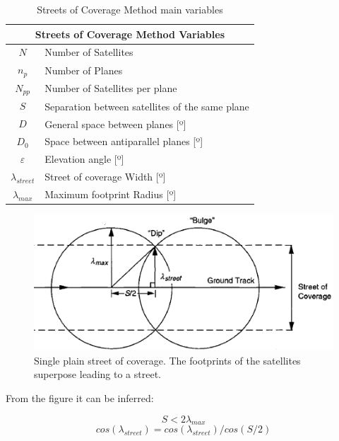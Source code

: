 \begin{table}[H]
\centering
\begin{tabular}{|c|l|}
\hline
\multicolumn{2}{|c|}{Streets of Coverage Method Variables}     \\ \hline
$$N$$              & Number of Satellites                      \\ \hline
$n_{p}$            & Number of Planes                          \\ \hline
$N_{pp}$           & Number of Satellites per plane            \\ \hline
$$S$$              & Separation between satellites of the same plane \\ \hline
$$D$$              & General space between planes {[}º{]}      \\ \hline
$D_{0}$            & Space between antiparallel planes {[}º{]} \\ \hline
$\varepsilon$      & Elevation angle {[}º{]}                   \\ \hline
$\lambda_{street}$ & Street of coverage Width {[}º{]}          \\ \hline
$\lambda_{max}$    & Maximum footprint Radius {[}º{]}          \\ \hline
\end{tabular}
\caption{Streets of Coverage Method main variables}
\end{table}  

\begin{figure}[H]
\begin{center}
\includegraphics[scale=0.7]{PolarOrbits/planestreet.png}
\caption[Single plain street of coverage]{Single plain street of coverage. The footprints of the satellites superpose leading to a street.\cite{ccar}}
\end{center}
\end{figure}

From the figure it can be inferred:

$$S < 2\lambda_{max}$$
$$cos(\lambda_{street}) = cos(\lambda_{street})/cos(S/2)$$

